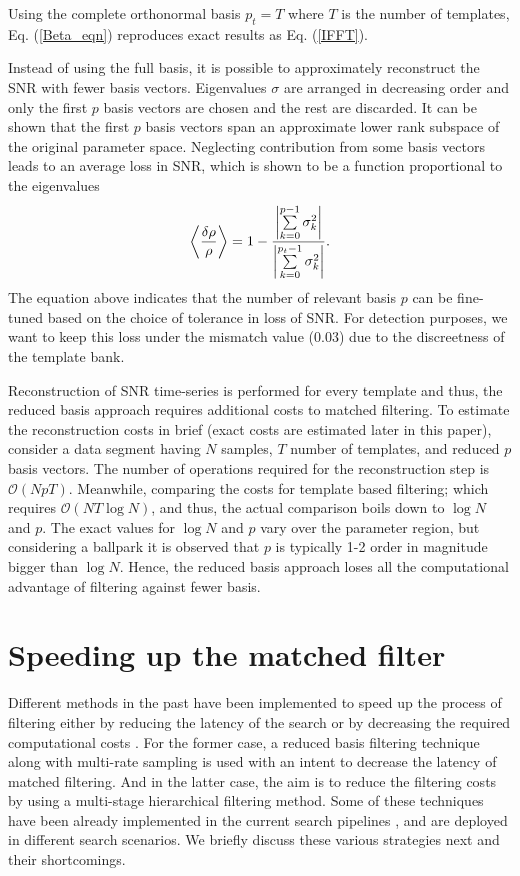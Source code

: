 Using the complete orthonormal basis $p_t = T$ where $T$ is the number of templates, Eq. (\ref{Beta_eqn}) reproduces exact results as Eq. (\ref{IFFT}). 

Instead of using the full basis, it is possible to approximately reconstruct the SNR with fewer basis vectors. Eigenvalues $\sigma$ are arranged in decreasing order and only the first $p$ basis vectors are chosen and the rest are discarded. It can be shown that the first $p$ basis vectors span an approximate lower rank subspace of the original parameter space. Neglecting contribution from some basis vectors leads to an average loss in SNR, which is shown to be a function proportional to the eigenvalues \cite{SVD_initial}
\begin{align}
    \label{SNR_loss}
    \Braket{\dfrac{\delta\rho}{\rho}} = 1 - \dfrac{\left|\sum \limits_{k=0}^{p-1}\sigma^2_{k}\right|}{\left|\sum \limits_{k=0}^{p_t-1}\sigma^2_{k}\right|}.
\end{align}
The equation above indicates that the number of relevant basis $p$ can be fine-tuned based on the choice of tolerance in loss of SNR. For detection purposes, we want to keep this loss under the mismatch value ($0.03$) due to the discreetness of the template bank. 

Reconstruction of SNR time-series is performed for every template and thus, the reduced basis approach requires additional costs to matched filtering. To estimate the reconstruction costs in brief (exact costs are estimated later in this paper), consider a data segment having $N$ samples, $T$ number of templates, and reduced $p$ basis vectors. The number of operations required for the reconstruction step is $\mathcal{O}(NpT)$. Meanwhile, comparing the costs for template based filtering; which requires $\mathcal{O}(NT\log N)$, and thus, the actual comparison boils down to $\log N $ and $p$. The exact values for $\log N$ and $p$ vary over the parameter region, but considering a ballpark it is observed that $p$ is typically 1-2 order in magnitude bigger than $\log N$. Hence, the reduced basis approach loses all the computational advantage of filtering against fewer basis.


\section{Speeding up the matched filter}
Different methods in the past have been implemented to speed up the process of filtering either by reducing the latency of the search \cite{SPIIR_initial, mbta_latest, LLOID} or by decreasing the required computational costs \cite{bhooshan, hierarchy_mass, hierarchy_tau0}. For the former case, a reduced basis filtering technique along with multi-rate sampling is used with an intent to decrease the latency of matched filtering. And in the latter case, the aim is to reduce the filtering costs by using a multi-stage hierarchical filtering method. Some of these techniques have been already implemented in the current search pipelines \cite{SPIIR_GPU, GSTlal_online, mbta_online}, and are deployed in different search scenarios. We briefly discuss these various strategies next and their shortcomings.

